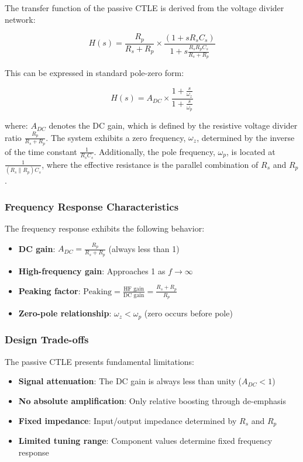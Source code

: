 The transfer function of the passive CTLE is derived from the voltage divider network:

\[
H(s) = \frac{R_p}{R_s + R_p} \times \frac{(1 + sR_sC_s)}{1 + s\frac{R_sR_pC_s}{R_s + R_p}}
\]

This can be expressed in standard pole-zero form:

\[
H(s) = A_{DC} \times \frac{1 + \frac{s}{\omega_z}}{1 + \frac{s}{\omega_p}}
\]

where: $A_{DC}$ denotes the DC gain, which is defined by the resistive voltage divider ratio $\frac{R_p}{R_s + R_p}$. The system exhibits a zero frequency, $\omega_z$, determined by the inverse of the time constant $\frac{1}{R_s C_s}$. Additionally, the pole frequency, $\omega_p$, is located at $\frac{1}{(R_s \parallel R_p)C_s}$, where the effective resistance is the parallel combination of $R_s$ and $R_p$.

\subsubsection{Frequency Response Characteristics}

The frequency response exhibits the following behavior:

\begin{itemize}
    \item \textbf{DC gain}: $A_{DC} = \frac{R_p}{R_s + R_p}$ (always less than 1)
    \item \textbf{High-frequency gain}: Approaches 1 as $f \rightarrow \infty$
    \item \textbf{Peaking factor}: $\text{Peaking} = \frac{\text{HF gain}}{\text{DC gain}} = \frac{R_s + R_p}{R_p}$
    \item \textbf{Zero-pole relationship}: $\omega_z < \omega_p$ (zero occurs before pole)
\end{itemize}

\subsubsection{Design Trade-offs}

The passive CTLE presents fundamental limitations:

\begin{itemize}
    \item \textbf{Signal attenuation}: The DC gain is always less than unity ($A_{DC} < 1$)
    \item \textbf{No absolute amplification}: Only relative boosting through de-emphasis
    \item \textbf{Fixed impedance}: Input/output impedance determined by $R_s$ and $R_p$
    \item \textbf{Limited tuning range}: Component values determine fixed frequency response
\end{itemize}

\newpage